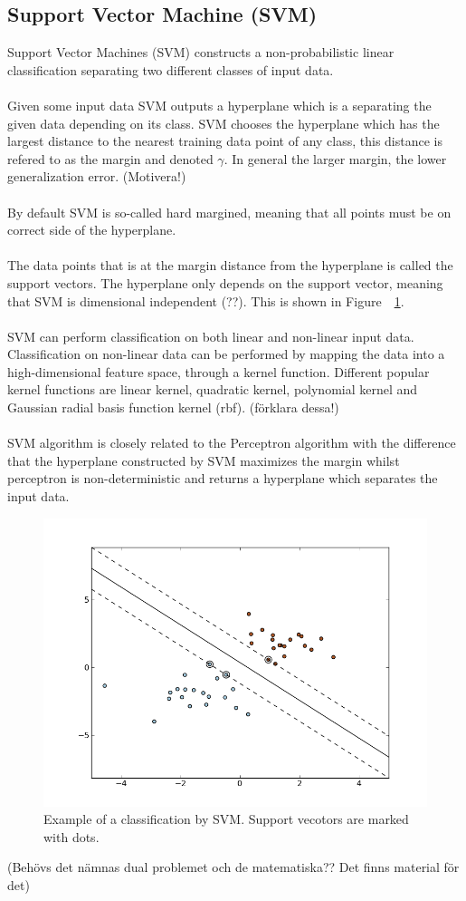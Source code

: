 \subsection{Support Vector Machine (SVM)}
Support Vector Machines (SVM) constructs a non-probabilistic linear classification separating two different classes of input data. 
\\\\
Given some input data SVM outputs a hyperplane which is a separating the given data depending on its class. SVM chooses the hyperplane which has the largest distance to the nearest training data point of any class, this distance is refered to as the margin and denoted $\gamma$. In general the larger margin, the lower generalization error. (Motivera!) 
\\\\
By default SVM is so-called hard margined, meaning that all points must be on correct side of the hyperplane. 
\\\\
The data points that is at the margin distance from the hyperplane is called the support vectors. The hyperplane only depends on the support vector, meaning that SVM is dimensional independent (??). This is shown in Figure~~\ref{fig:svm}.
\\\\
SVM can perform classification on both linear and non-linear input data. Classification on non-linear data can be performed by mapping the data into a high-dimensional feature space, through a kernel function. Different popular kernel functions are linear kernel, quadratic kernel, polynomial kernel and Gaussian radial basis function kernel (rbf). (förklara dessa!)
\\\\
SVM algorithm is closely related to the Perceptron algorithm with the difference that the hyperplane constructed by SVM maximizes the margin whilst perceptron is non-deterministic and returns a hyperplane which separates the input data. 
\begin{figure}[h!]
\centering
\includegraphics[scale = 0.5]{fig/svm_example_stolen.png}
\caption{Example of a classification by SVM. Support vecotors are marked with dots. \citep{svm_picture}}
\label{fig:svm}
\end{figure}
(Behövs det nämnas dual problemet och de matematiska?? Det finns material för det) 
